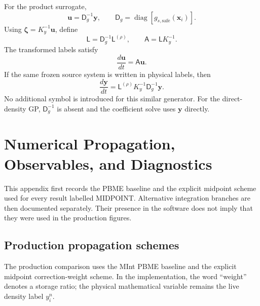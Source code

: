 \documentclass[
  11pt,
  letterpaper,
  onehalfspacing,
  normalmargins,
  equalmargins,
  oneside
]{ut-thesis}
\begin{document}
For the product surrogate,
\begin{equation}
\mathbf u
=
\mathsf D_g^{-1}\mathbf y,
\qquad
\mathsf D_g
=
\operatorname{diag}
\left[
 g_{s,\mathrm{safe}}(\mathbf x_i)
\right].
\label{appeq:appendix-label-transform}
\end{equation}
Using \(\boldsymbol\zeta=K_y^{-1}\mathbf u\), define
\begin{equation}
\mathsf L
=
\mathsf D_g^{-1}\mathsf L^{(\rho)},
\qquad
\mathsf A
=
\mathsf L K_y^{-1}.
\label{appeq:appendix-source-generator}
\end{equation}
The transformed labels satisfy
\begin{equation}
\frac{d\mathbf u}{dt}
=
\mathsf A\mathbf u.
\label{appeq:modulation-generator}
\end{equation}
If the same frozen source system is written in physical labels, then
\begin{equation}
\frac{d\mathbf y}{dt}
=
\mathsf L^{(\rho)}K_y^{-1}\mathsf D_g^{-1}\mathbf y.
\label{appeq:physical-label-generator}
\end{equation}
No additional symbol is introduced for this similar generator. For the
direct-density GP, \(\mathsf D_g^{-1}\) is absent and the coefficient solve
uses \(\mathbf y\) directly.

\chapter[Propagation and Diagnostics]{Numerical Propagation, Observables, and Diagnostics}
\label{app:numerical-propagation-diagnostics}

This appendix first records the PBME baseline and the explicit midpoint scheme
used for every result labelled MIDPOINT. Alternative integration branches are
then documented separately. Their presence in the software does not imply
that they were used in the production figures.

\section{Production propagation schemes}
\label{appsec:implemented-integrators}

The production comparison uses the MInt PBME baseline and the explicit
midpoint correction-weight scheme. In the implementation, the word
``weight'' denotes a storage ratio; the physical mathematical variable remains
the live density label $y_i^n$.
\end{document}
